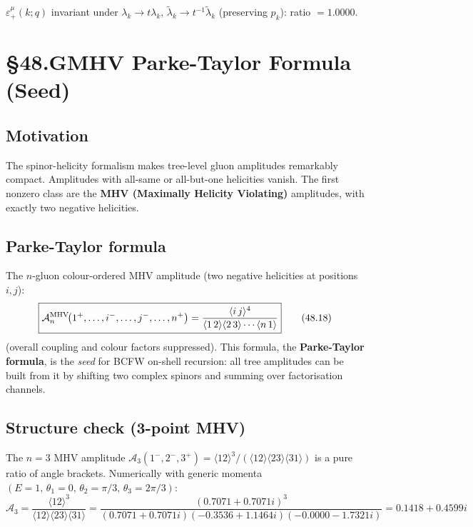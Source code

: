 \documentclass[12pt]{article}
\newcommand{\verified}[1]{\textcolor{verifygreen}{\checkmark\; #1}}
\begin{document}
\verified{$\varepsilon_+^\mu(k;q)$ invariant under $\lambda_k\to t\lambda_k$,
$\tilde\lambda_k\to t^{-1}\tilde\lambda_k$ (preserving $p_k$): ratio $= 1.0000$.}

\section{§48.G\quad MHV Parke-Taylor Formula (Seed)}

\subsection{Motivation}

The spinor-helicity formalism makes tree-level gluon amplitudes remarkably
compact.  Amplitudes with all-same or all-but-one helicities vanish.
The first nonzero class are the \textbf{MHV (Maximally Helicity Violating)}
amplitudes, with exactly two negative helicities.

\subsection{Parke-Taylor formula}

The $n$-gluon colour-ordered MHV amplitude (two negative helicities at positions $i,j$):
\begin{equation}
  \boxed{
    \mathcal{A}_n^{\rm MHV}\!\bigl(1^+,\ldots,i^-,\ldots,j^-,\ldots,n^+\bigr)
    = \frac{\langle i\,j\rangle^4}
           {\langle 1\,2\rangle\langle 2\,3\rangle\cdots\langle n\,1\rangle}
  }
  \tag{48.18}
\end{equation}
(overall coupling and colour factors suppressed).
This formula, the \textbf{Parke-Taylor formula}, is the \emph{seed} for BCFW
on-shell recursion: all tree amplitudes can be built from it by shifting two
complex spinors and summing over factorisation channels.

\subsection{Structure check (3-point MHV)}

The $n=3$ MHV amplitude
$\mathcal{A}_3(1^-,2^-,3^+) = \langle12\rangle^3/(\langle12\rangle\langle23\rangle\langle31\rangle)$
is a pure ratio of angle brackets.  Numerically with generic momenta
$(E=1,\,\theta_1=0,\,\theta_2=\pi/3,\,\theta_3=2\pi/3)$:
\[
  \mathcal{A}_3 = \frac{\langle12\rangle^3}{\langle12\rangle\langle23\rangle\langle31\rangle}
  = \frac{(0.7071+0.7071i)^3}{(0.7071+0.7071i)(-0.3536+1.1464i)(-0.0000-1.7321i)}
  = 0.1418+0.4599i
\]
\end{document}
